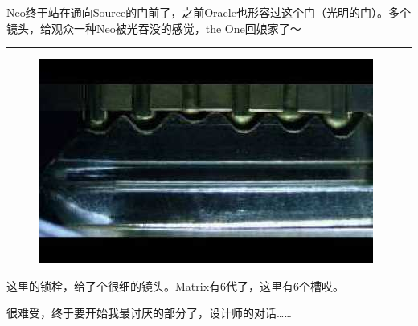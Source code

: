 \documentclass{ctexart}
\newcommand{\myparsep}{\noindent \rule[0.5ex]{\linewidth}{1pt}}
\begin{document}
Neo终于站在通向Source的门前了，之前Oracle也形容过这个门（光明的门）。多个镜头，给观众一种Neo被光吞没的感觉，the One回娘家了～

\myparsep

\begin{figure}[htb]
\centering
\includegraphics[width=0.5\linewidth]{fig/read_reloaded-155}
\end{figure}

这里的锁栓，给了个很细的镜头。Matrix有6代了，这里有6个槽哎。

很难受，终于要开始我最讨厌的部分了，设计师的对话……
\end{document}
